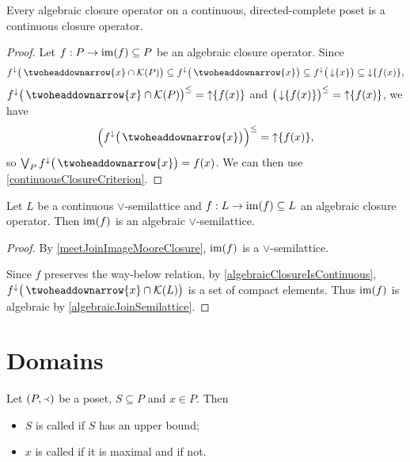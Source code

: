 \begin{lemma} \label{algebraicClosureIsContinuous}
Every algebraic closure operator on a continuous, directed-complete poset is a continuous closure operator.
\end{lemma}
\begin{proof}
Let $f: P\to \operatorname{im}(f)\subseteq P$ be an algebraic closure operator. Since
\[ f^\imf\big(\ddownset\{x\}\cap \compacts(P)\big) \subseteq f^\imf\big(\ddownset\{x\}\big) \subseteq f^\imf\big(\downset\{x\}\big) \subseteq \downset\{f(x)\}, \]
$f^\imf\big(\ddownset\{x\}\cap \compacts(P)\big)^\leq = \upset\{f(x)\}$ and $\big(\operatorname{\downarrow}\{f(x)\}\big)^\leq = \operatorname{\uparrow}\{f(x)\}$, we have
\[ \Big(f^\imf\big(\ddownset\{x\}\big)\Big)^\leq = \upset\{f(x)\}, \]
so $\bigvee_P f^\imf\big(\ddownset\{x\}\big) = f(x)$. We can then use \ref{continuousClosureCriterion}.
\end{proof}

\begin{proposition} \label{imageAlgebraicClosureAlgebraicLattice}
Let $L$ be a continuous $\vee$-semilattice and $f: L\to \operatorname{im}(f)\subseteq L$ an algebraic closure operator. Then $\operatorname{im}(f)$ is an algebraic $\vee$-semilattice.
\end{proposition}
\begin{proof}
By \ref{meetJoinImageMooreClosure}, $\operatorname{im}(f)$ is a $\vee$-semilattice. 

Since $f$ preserves the way-below relation, by \ref{algebraicClosureIsContinuous}, $f^\imf\big(\ddownset\{x\}\cap \compacts(L)\big)$ is a set of compact elements. Thus $\operatorname{im}(f)$ is algebraic by \ref{algebraicJoinSemilattice}.
\end{proof}


\section{Domains}
\begin{definition}
Let $\sSet{P,\Yleft}$ be a poset, $S\subseteq P$ and $x\in P$. Then
\begin{itemize}
\item $S$ is called  if $S$ has an upper bound;
\item $x$ is called  if it is maximal and  if not.
\end{itemize}
\end{definition}


